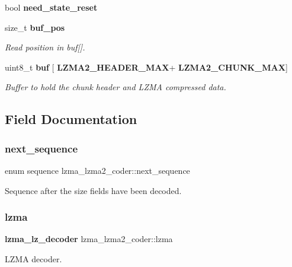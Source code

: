 \begin{DoxyCompactItemize}
\mbox{\label{structlzma__lzma2__coder_ac24d7971d794da94874082f3e8d5ace1}} 
bool {\bfseries need\+\_\+state\+\_\+reset}
\item 
size\+\_\+t \textbf{ buf\+\_\+pos}
\begin{DoxyCompactList}\small\item\em Read position in buf[]. \end{DoxyCompactList}\item 
uint8\+\_\+t \textbf{ buf} [\textbf{ L\+Z\+M\+A2\+\_\+\+H\+E\+A\+D\+E\+R\+\_\+\+M\+AX}+\textbf{ L\+Z\+M\+A2\+\_\+\+C\+H\+U\+N\+K\+\_\+\+M\+AX}]
\begin{DoxyCompactList}\small\item\em Buffer to hold the chunk header and L\+Z\+MA compressed data. \end{DoxyCompactList}\end{DoxyCompactItemize}


\subsection{Field Documentation}
\mbox{\label{structlzma__lzma2__coder_aa77106ac23877460518734303303b1fb}} 
\subsubsection{next\+\_\+sequence}
{\footnotesize\ttfamily enum sequence lzma\+\_\+lzma2\+\_\+coder\+::next\+\_\+sequence}



Sequence after the size fields have been decoded. 

\mbox{\label{structlzma__lzma2__coder_aa7cf8d8055328d154484d8bc716f05d2}} 
\subsubsection{lzma\hspace{0.1cm}{\footnotesize\ttfamily [1/2]}}
{\footnotesize\ttfamily \textbf{ lzma\+\_\+lz\+\_\+decoder} lzma\+\_\+lzma2\+\_\+coder\+::lzma}



L\+Z\+MA decoder. 

